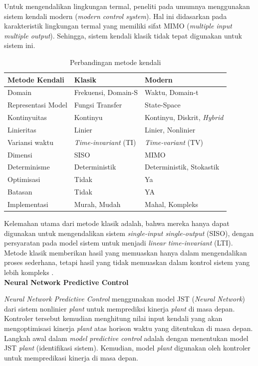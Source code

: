 Untuk mengendalikan lingkungan termal, peneliti pada umumnya menggunakan sistem kendali modern (\textit{modern control system}). Hal ini didasarkan pada karakteristik lingkungan termal yang memiliki sifat MIMO (\textit{multiple input multiple output}). Sehingga, sistem kendali klasik tidak tepat digunakan untuk sistem ini.
\begin{table}[!h]
	\caption{Perbandingan metode kendali}
	\label{tbl:3:whyann}
	\centering
	\begin{tabular}{|p{4cm}|p{4cm}|p{4.5cm}|}
		\hline
		\textbf{Metode Kendali} & \textbf{Klasik} & \textbf{Modern} \\ 
		\hline
		Domain & Frekuensi, Domain-S & Waktu, Domain-t \\ 
		\hline
		Representasi Model & Fungsi Transfer & State-Space \\ 
		\hline
		Kontinyuitas & Kontinyu & Kontinyu, Diskrit, \textit{Hybrid} \\ 
		\hline
		Linieritas & Linier & Linier, Nonlinier \\ 
		\hline
		Variansi waktu & \textit{Time-invariant} (TI) & \textit{Time-variant} (TV) \\ 
		\hline
		Dimensi & SISO & MIMO \\ 
		\hline
		Determinisme & Deterministik & Deterministik, Stokastik \\ 
		\hline
		Optimisasi & Tidak & Ya \\ 
		\hline
		Batasan & Tidak & YA \\ 
		\hline
		Implementasi & Murah, Mudah & Mahal, Kompleks \\ 
		\hline
	\end{tabular}
\end{table}

Kelemahan utama dari metode klasik adalah, bahwa mereka hanya dapat digunakan untuk mengendalikan sistem \textit{single-input single-output} (SISO), dengan persyaratan pada model sistem untuk menjadi \textit{linear time-invariant} (LTI). Metode klasik memberikan hasil yang memuaskan hanya dalam mengendalikan proses sederhana, tetapi hasil yang tidak memuaskan dalam kontrol sistem yang lebih kompleks \cite{MPCDissertation}. \\

\noindent \textbf{Neural Network Predictive Control}

\textit{Neural Network Predictive Control} menggunakan model JST (\textit{Neural Network}) dari sistem nonlinier \textit{plant} untuk memprediksi kinerja \textit{plant} di masa depan. Kontroler tersebut kemudian menghitung nilai input kendali yang akan mengoptimisasi kinerja \textit{plant} atas horison waktu yang ditentukan di masa depan. Langkah awal dalam \textit{model predictive control} adalah dengan menentukan model JST \textit{plant} (identifikasi sistem). Kemudian, model \textit{plant} digunakan oleh kontroler untuk mempredikasi kinerja di masa depan.\\

